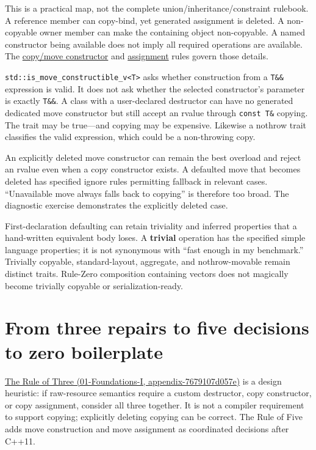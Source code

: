 This is a practical map, not the complete union/inheritance/constraint rulebook. A reference member can copy-bind, yet generated assignment is deleted. A non-copyable owner member can make the containing object non-copyable. A named constructor being available does not imply all required operations are available. The \href{https://eel.is/c++draft/class.copy.ctor}{copy/move constructor} and \href{https://eel.is/c++draft/class.copy.assign}{assignment} rules govern those details.

\texttt{std::is\_move\_constructible\_v\textless{}T\textgreater{}} asks whether construction from a \texttt{T\&\&} expression is valid. It does not ask whether the selected constructor's parameter is exactly \texttt{T\&\&}. A class with a user-declared destructor can have no generated dedicated move constructor but still accept an rvalue through \texttt{const\ T\&} copying. The trait may be true---and copying may be expensive. Likewise a nothrow trait classifies the valid expression, which could be a non-throwing copy.

An explicitly deleted move constructor can remain the best overload and reject an rvalue even when a copy constructor exists. A defaulted move that becomes deleted has specified ignore rules permitting fallback in relevant cases. ``Unavailable move always falls back to copying'' is therefore too broad. The diagnostic exercise demonstrates the explicitly deleted case.

First-declaration defaulting can retain triviality and inferred properties that a hand-written equivalent body loses. A \textbf{trivial} operation has the specified simple language properties; it is not synonymous with ``fast enough in my benchmark.'' Trivially copyable, standard-layout, aggregate, and nothrow-movable remain distinct traits. Rule-Zero composition containing vectors does not magically become trivially copyable or serialization-ready.

\section{From three repairs to five decisions to zero boilerplate}\label{05-engine-i-ch003-from-three-repairs-to-five-decisions-to-zero-boilerplate}

\href{../01-Foundations-I/main.pdf\#nameddest=appendix-7679107d057e}{The Rule of Three (01-Foundations-I, appendix-7679107d057e)} is a design heuristic: if raw-resource semantics require a custom destructor, copy constructor, or copy assignment, consider all three together. It is not a compiler requirement to support copying; explicitly deleting copying can be correct. The Rule of Five adds move construction and move assignment as coordinated decisions after C++11.

